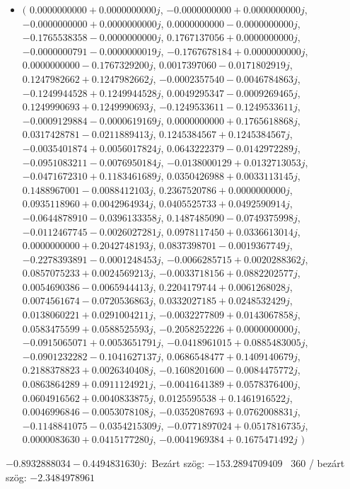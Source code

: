 \documentclass[14pt,a4paper]{article}
\begin{document}
\begin{itemize}
\item
$\big($
$0.0000000000+0.0000000000j$, $-0.0000000000+0.0000000000j$, $-0.0000000000+0.0000000000j$, $0.0000000000-0.0000000000j$, $-0.1765538358-0.0000000000j$, $0.1767137056+0.0000000000j$, $-0.0000000791-0.0000000019j$, $-0.1767678184+0.0000000000j$, $0.0000000000-0.1767329200j$, $0.0017397060-0.0171802919j$, $0.1247982662+0.1247982662j$, $-0.0002357540-0.0046784863j$, $-0.1249944528+0.1249944528j$, $0.0049295347-0.0009269465j$, $0.1249990693+0.1249990693j$, $-0.1249533611-0.1249533611j$, $-0.0009129884-0.0000619169j$, $0.0000000000+0.1765618868j$, $0.0317428781-0.0211889413j$, $0.1245384567+0.1245384567j$, $-0.0035401874+0.0056017824j$, $0.0643222379-0.0142972289j$, $-0.0951083211-0.0076950184j$, $-0.0138000129+0.0132713053j$, $-0.0471672310+0.1183461689j$, $0.0350426988+0.0033113145j$, $0.1488967001-0.0088412103j$, $0.2367520786+0.0000000000j$, $0.0935118960+0.0042964934j$, $0.0405525733+0.0492590914j$, $-0.0644878910-0.0396133358j$, $0.1487485090-0.0749375998j$, $-0.0112467745-0.0026027281j$, $0.0978117450+0.0336613014j$, $0.0000000000+0.2042748193j$, $0.0837398701-0.0019367749j$, $-0.2278393891-0.0001248453j$, $-0.0066285715+0.0020288362j$, $0.0857075233+0.0024569213j$, $-0.0033718156+0.0882202577j$, $0.0054690386-0.0065944413j$, $0.2204179744+0.0061268028j$, $0.0074561674-0.0720536863j$, $0.0332027185+0.0248532429j$, $0.0138060221+0.0291004211j$, $-0.0032277809+0.0143067858j$, $0.0583475599+0.0588525593j$, $-0.2058252226+0.0000000000j$, $-0.0915065071+0.0053651791j$, $-0.0418961015+0.0885483005j$, $-0.0901232282-0.1041627137j$, $0.0686548477+0.1409140679j$, $0.2188378823+0.0026340408j$, $-0.1608201600-0.0084475772j$, $0.0863864289+0.0911124921j$, $-0.0041641389+0.0578376400j$, $0.0604916562+0.0040833875j$, $0.0125595538+0.1461916522j$, $0.0046996846-0.0053078108j$, $-0.0352087693+0.0762008831j$, $-0.1148841075-0.0354215309j$, $-0.0771897024+0.0517816735j$, $0.0000083630+0.0415177280j$, $-0.0041969384+0.1675471492j$
$\big)$
\end{itemize}
$-0.8932888034-0.4494831630j$:\
Bezárt szög: $-153.2894709409$ \
360 / bezárt szög: $-2.3484978961$\
\end{document}
